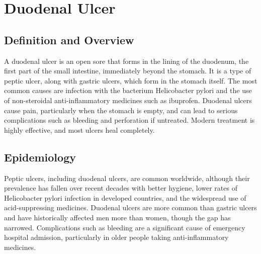 \chapter{Duodenal Ulcer}

\section*{Definition and Overview}
A duodenal ulcer is an open sore that forms in the lining of the duodenum, the first part of the small intestine, immediately beyond the stomach. It is a type of peptic ulcer, along with gastric ulcers, which form in the stomach itself. The most common causes are infection with the bacterium Helicobacter pylori and the use of non-steroidal anti-inflammatory medicines such as ibuprofen. Duodenal ulcers cause pain, particularly when the stomach is empty, and can lead to serious complications such as bleeding and perforation if untreated. Modern treatment is highly effective, and most ulcers heal completely.

\section*{Epidemiology}
Peptic ulcers, including duodenal ulcers, are common worldwide, although their prevalence has fallen over recent decades with better hygiene, lower rates of Helicobacter pylori infection in developed countries, and the widespread use of acid-suppressing medicines. Duodenal ulcers are more common than gastric ulcers and have historically affected men more than women, though the gap has narrowed. Complications such as bleeding are a significant cause of emergency hospital admission, particularly in older people taking anti-inflammatory medicines.

